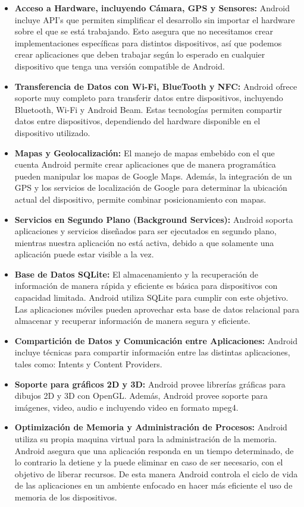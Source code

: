 \begin{itemize}
	\item \textbf{Acceso a Hardware, incluyendo Cámara, GPS y Sensores: }Android incluye API’s que permiten simplificar el desarrollo sin importar el hardware sobre el que se está trabajando. Esto asegura que no necesitamos crear implementaciones específicas para distintos dispositivos, así que podemos crear aplicaciones que deben trabajar según lo esperado en cualquier dispositivo que tenga una versión compatible de Android.
	\item \textbf{Transferencia de Datos con Wi-Fi, BlueTooth y NFC: } Android ofrece soporte muy completo para transferir datos entre dispositivos, incluyendo Bluetooth, Wi-Fi y Android Beam. Estas tecnologías permiten compartir datos entre dispositivos, dependiendo del hardware disponible en el dispositivo utilizado.
	\item \textbf{Mapas y Geolocalización: }El manejo de mapas embebido con el que cuenta Android permite crear aplicaciones que de manera programática pueden manipular los mapas de Google Maps. Además, la integración de un GPS y los servicios de localización de Google para determinar la ubicación actual del dispositivo, permite combinar posicionamiento con mapas.
	\item \textbf{Servicios en Segundo Plano (Background Services): }Android soporta aplicaciones y servicios diseñados para ser ejecutados en segundo plano, mientras nuestra aplicación no está activa, debido a que solamente una aplicación puede estar visible a la vez. 
	\item \textbf{Base de Datos SQLite: }El almacenamiento y la recuperación de información de manera rápida y eficiente es básica para dispositivos con capacidad limitada. Android utiliza SQLite para cumplir con este objetivo. Las aplicaciones móviles pueden aprovechar esta base de datos relacional para almacenar y recuperar información de manera segura y eficiente.
	\item \textbf{Compartición de Datos y Comunicación entre Aplicaciones: }Android incluye técnicas para compartir información entre las distintas aplicaciones, tales como: Intents y Content Providers.
	\item \textbf{ Soporte para gráficos 2D y 3D: }Android provee librerías gráficas para dibujos 2D y 3D con OpenGL. Además, Android provee soporte para imágenes, video, audio e incluyendo video en formato mpeg4.
	\item \textbf{Optimización de Memoria y Administración de Procesos: }Android utiliza su propia maquina virtual para la administración de la memoria. Android asegura que una aplicación responda en un tiempo determinado, de lo contrario la detiene y la puede eliminar en caso de ser necesario, con el objetivo de liberar recursos. De esta manera Android controla el ciclo de vida de las aplicaciones en un ambiente enfocado en hacer más eficiente el uso de memoria de los dispositivos. \cite{presentacionAndroid}
\end{itemize}
